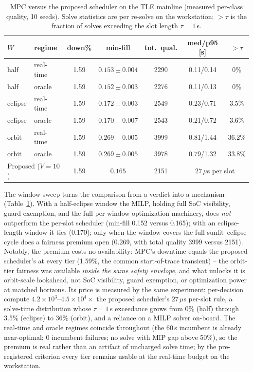\begin{table}[!t]
\caption{MPC versus the proposed scheduler on the TLE mainline (measured
per-class quality, 10 seeds). Solve statistics are per re-solve on the
workstation; $>\tau$ is the fraction of solves exceeding the slot length
$\tau=1$\,s.}
\label{tab_mpc}
\centering
\begin{tabular}{llccccc}
\toprule
$W$ & regime & down\% & min-fill & tot.\ qual. & med/p95 [s] & $>\tau$ \\
\midrule
half    & real-time & 1.59 & $0.153{\pm}0.004$ & 2290 & 0.11/0.14 & 0\% \\
half    & oracle    & 1.59 & $0.152{\pm}0.003$ & 2276 & 0.11/0.13 & 0\% \\
eclipse & real-time & 1.59 & $0.172{\pm}0.003$ & 2549 & 0.23/0.71 & 3.5\% \\
eclipse & oracle    & 1.59 & $0.170{\pm}0.007$ & 2543 & 0.21/0.72 & 3.6\% \\
orbit   & real-time & 1.59 & $0.269{\pm}0.005$ & 3999 & 0.81/1.44 & 36.2\% \\
orbit   & oracle    & 1.59 & $0.269{\pm}0.005$ & 3978 & 0.79/1.32 & 33.8\% \\
\midrule
\multicolumn{2}{l}{Proposed ($V{=}10$)} & 1.59 & $0.165$ & 2151 &
\multicolumn{2}{c}{$27\,\mu$s per slot} \\
\bottomrule
\end{tabular}
\end{table}

The window sweep turns the comparison from a verdict into a mechanism
(Table~\ref{tab_mpc}). With a half-eclipse window the MILP, holding full SoC
visibility, guard exemption, and the full per-window optimization machinery,
does \emph{not} outperform the per-slot scheduler (min-fill 0.152 versus
0.165); with an eclipse-length window it ties (0.170); only when the window
covers the full sunlit--eclipse cycle does a fairness premium open (0.269,
with total quality 3999 versus 2151). Notably, the premium costs no
availability: MPC's downtime equals the proposed scheduler's at every tier
(1.59\%, the common start-of-trace transient) -- the orbit-tier fairness was
available \emph{inside the same safety envelope}, and what unlocks it is
orbit-scale lookahead, not SoC visibility, guard exemption, or optimization
power at matched horizons. Its price is measured by the same experiment:
per-decision compute $4.2\times10^{3}$--$4.5\times10^{4}\times$ the proposed
scheduler's $27\,\mu$s per-slot rule, a solve-time distribution whose
$\tau{=}1$\,s exceedance grows from 0\% (half) through 3.5\% (eclipse) to
36\% (orbit), and a reliance on a MILP solver on-board. The real-time and
oracle regimes coincide throughout (the 60\,s incumbent is already
near-optimal; 0 incumbent failures; no solve with MIP gap above 50\%), so
the premium is real rather than an artifact of uncharged solve time; by the
pre-registered criterion every tier remains usable at the real-time budget
on the workstation.

